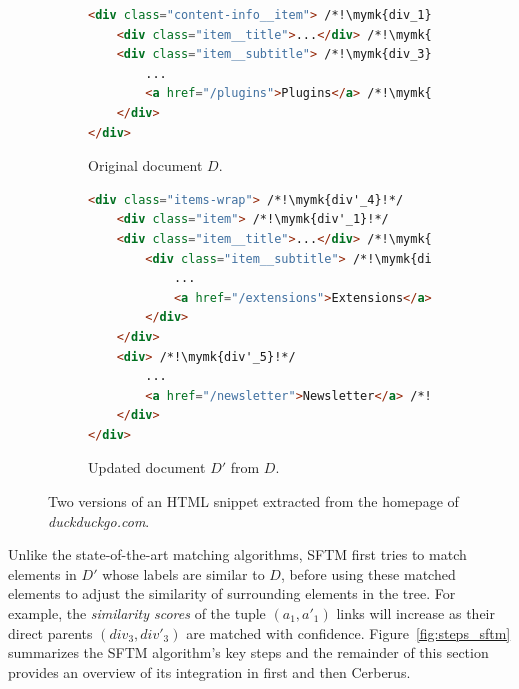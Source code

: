 \begin{figure}
    \centering
    \begin{subfigure}[b]{\linewidth}
        \centering
        \caption{Original document $D$.}
        \begin{lstlisting}[language=html, label={fig:first_version}]
<div class="content-info__item"> /*!\mymk{div_1}!*/
    <div class="item__title">...</div> /*!\mymk{div_2}!*/
    <div class="item__subtitle"> /*!\mymk{div_3}!*/
        ... 
        <a href="/plugins">Plugins</a> /*!\mymk{~a_1~}!*/
    </div>
</div>
        \end{lstlisting}
    \end{subfigure}
    \hfill
    \begin{subfigure}[b]{\linewidth}
        \centering
        \caption{Updated document $D'$ from $D$.}
        \begin{lstlisting}[language=html, label={fig:second_version}]
<div class="items-wrap"> /*!\mymk{div'_4}!*/
    <div class="item"> /*!\mymk{div'_1}!*/
    <div class="item__title">...</div> /*!\mymk{div'_2}!*/
        <div class="item__subtitle"> /*!\mymk{div'_3}!*/
            ... 
            <a href="/extensions">Extensions</a> /*!\mymk{~a'_1~}!*/
        </div>
    </div>
    <div> /*!\mymk{div'_5}!*/  
        ...
        <a href="/newsletter">Newsletter</a> /*!\mymk{~a'_2~}!*/
    </div>
</div>
        \end{lstlisting}
    \end{subfigure}
    \caption{Two versions of an HTML snippet extracted from the homepage of \emph{duckduckgo.com}.}
    \label{fig:example_html}
\end{figure}

Unlike the state-of-the-art matching algorithms, SFTM first tries to match elements in $D'$ whose labels are similar to $D$, before using these matched elements to adjust the similarity of surrounding elements in the tree.
For example, the \emph{similarity scores} of the tuple $(a_1,a'_1)$ links will increase as their direct parents $(div_3,div'_3)$ are matched with confidence.
% 
Figure~\ref{fig:steps_sftm} summarizes the SFTM algorithm's key steps and the remainder of this section provides an overview of its integration in \erratum{} first and then Cerberus.

